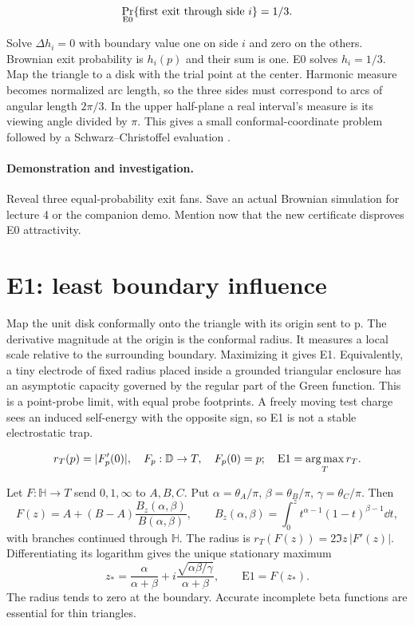 \documentclass[11pt,oneside,openany]{book}
\newcommand{\argmax}{\operatorname*{arg\,max}}\newcommand{\argmin}{\operatorname*{arg\,min}}
\begin{document}
\[\Pr_{\rm E0}\{\hbox{first exit through side }i\}=1/3.\]



Solve $\Delta h_i=0$ with boundary value one on side $i$ and zero on
the others. Brownian exit probability is $h_i(p)$ and their sum is
one. E0 solves $h_i=1/3$.
Map the triangle to a disk with the trial point at the center.
Harmonic measure becomes normalized arc length, so the three sides
must correspond to arcs of angular length $2\pi/3$.
In the upper half-plane a real interval's measure is its viewing
angle divided by $\pi$. This gives a small conformal-coordinate
problem followed by a Schwarz--Christoffel evaluation
\cite{iannaccone}.




\paragraph{Demonstration and investigation.} Reveal three equal-probability exit fans. Save an actual Brownian simulation for lecture 4 or the companion demo. Mention now that the new certificate disproves E0 attractivity.


\section{E1: least boundary influence}\label{sec:slide21}

Map the unit disk conformally onto the triangle with its origin sent to p. The derivative magnitude at the origin is the conformal radius. It measures a local scale relative to the surrounding boundary. Maximizing it gives E1. Equivalently, a tiny electrode of fixed radius placed inside a grounded triangular enclosure has an asymptotic capacity governed by the regular part of the Green function. This is a point-probe limit, with equal probe footprints. A freely moving test charge sees an induced self-energy with the opposite sign, so E1 is not a stable electrostatic trap.


\[r_T(p)=|F_p^\prime(0)|,\quad F_p:\mathbb D\to T,\quad F_p(0)=p;\quad {\rm E1}=\argmax_T r_T.\]



Let $F:\mathbb H\to T$ send $0,1,\infty$ to $A,B,C$. Put
$\alpha=\theta_A/\pi$, $\beta=\theta_B/\pi$, $\gamma=\theta_C/\pi$.
Then
\[
F(z)=A+(B-A)\frac{B_z(\alpha,\beta)}{B(\alpha,\beta)},\qquad
B_z(\alpha,\beta)=\int_0^z t^{\alpha-1}(1-t)^{\beta-1}\dd t,
\]
with branches continued through $\mathbb H$.
The radius is $r_T(F(z))=2\Im z\,|F'(z)|$.
Differentiating its logarithm gives the unique stationary maximum
\[
z_*=\frac{\alpha}{\alpha+\beta}
+i\frac{\sqrt{\alpha\beta/\gamma}}{\alpha+\beta},
\qquad \mathrm{E1}=F(z_*).
\]
The radius tends to zero at the boundary. Accurate incomplete beta
functions are essential for thin triangles.
\end{document}

